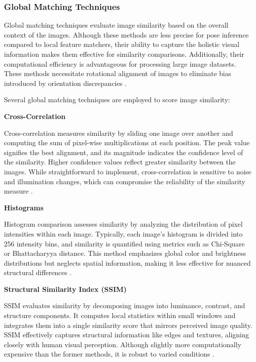 \subsubsection{Global Matching Techniques}

Global matching techniques evaluate image similarity based on the overall context of the images. Although these methods are less precise for pose inference compared to local feature matchers, their ability to capture the holistic visual information makes them effective for similarity comparisons. Additionally, their computational efficiency is advantageous for processing large image datasets. These methods necessitate rotational alignment of images to eliminate bias introduced by orientation discrepancies \cite{GlobalLocal2023}.

Several global matching techniques are employed to score image similarity:

\textbf{Cross-Correlation}

Cross-correlation measures similarity by sliding one image over another and computing the sum of pixel-wise multiplications at each position. The peak value signifies the best alignment, and its magnitude indicates the confidence level of the similarity. Higher confidence values reflect greater similarity between the images. While straightforward to implement, cross-correlation is sensitive to noise and illumination changes, which can compromise the reliability of the similarity measure \cite{sharma2022crosscorrelation}.

\textbf{Histograms}

Histogram comparison assesses similarity by analyzing the distribution of pixel intensities within each image. Typically, each image's histogram is divided into 256 intensity bins, and similarity is quantified using metrics such as Chi-Square or Bhattacharyya distance. This method emphasizes global color and brightness distributions but neglects spatial information, making it less effective for nuanced structural differences \cite{rosebrock2014comparehistograms}.

\textbf{Structural Similarity Index (SSIM)}

SSIM evaluates similarity by decomposing images into luminance, contrast, and structure components. It computes local statistics within small windows and integrates them into a single similarity score that mirrors perceived image quality. SSIM effectively captures structural information like edges and textures, aligning closely with human visual perception. Although slightly more computationally expensive than the former methods, it is robust to varied conditions \cite{rosebrock2017imagedifference}.

